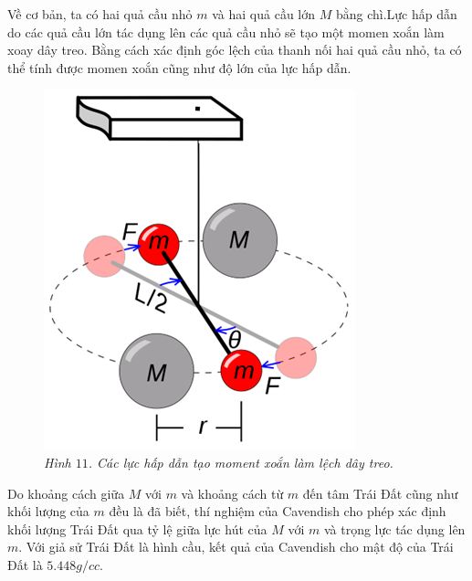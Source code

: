\begin{multicols}{2}
\begin{figure}[H]
		\vspace*{-10pt}
	\end{figure}
	Về cơ bản, ta có hai quả cầu nhỏ $m$ và hai quả cầu lớn $M$ bằng chì.Lực hấp dẫn do các quả cầu lớn tác dụng lên các quả cầu nhỏ sẽ tạo một momen xoắn làm xoay dây treo. Bằng cách xác định góc lệch của thanh nối hai quả cầu nhỏ, ta có thể tính được momen xoắn cũng như độ lớn của lực hấp dẫn.
	\begin{figure}[H]
		\vspace*{-5pt}
		\centering
		\captionsetup{labelformat= empty, justification=centering}
		\includegraphics[width =1\linewidth]{13}
		\caption{\small\textit{\color{timhieukhoahoc}Hình $11$. Các lực hấp dẫn tạo moment xoắn làm lệch dây treo.}}
		\vspace*{-10pt}
	\end{figure}
	Do khoảng cách giữa $M$ với $m$ và khoảng cách từ $m$ đến tâm Trái Đất cũng như khối lượng của $m$ đều là đã biết, thí nghiệm của Cavendish cho phép xác định khối lượng Trái Đất qua tỷ lệ giữa lực hút của $M$ với $m$ và trọng lực tác dụng lên $m$. Với giả sử Trái Đất là hình cầu, kết quả của Cavendish cho mật độ của Trái Đất là $5{.}448 g/cc$.

\end{multicols}
